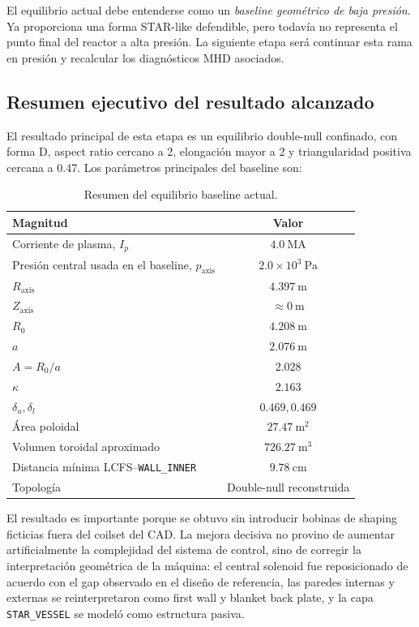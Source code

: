 \documentclass[11pt,a4paper]{article}
\begin{document}
El equilibrio actual debe entenderse como un \emph{baseline geométrico de baja presión}. Ya
proporciona una forma STAR-like defendible, pero todavía no representa el punto final del
reactor a alta presión. La siguiente etapa será continuar esta rama en presión y recalcular
los diagnósticos MHD asociados.

\subsection{Resumen ejecutivo del resultado alcanzado}
El resultado principal de esta etapa es un equilibrio double-null confinado, con forma D,
aspect ratio cercano a 2, elongación mayor a 2 y triangularidad positiva cercana a 0.47. Los
parámetros principales del baseline son:

\begin{table}[htbp]
\centering
\caption{Resumen del equilibrio baseline actual.}
\label{tab:baseline_summary_exec}
\begin{tabular}{lc}
\toprule
\textbf{Magnitud} & \textbf{Valor} \\
\midrule
Corriente de plasma, $I_p$ & $4.0~\mathrm{MA}$ \\
Presión central usada en el baseline, $p_{\mathrm{axis}}$ & $2.0\times 10^3~\mathrm{Pa}$ \\
$R_{\mathrm{axis}}$ & $4.397~\mathrm{m}$ \\
$Z_{\mathrm{axis}}$ & $\approx 0~\mathrm{m}$ \\
$R_0$ & $4.208~\mathrm{m}$ \\
$a$ & $2.076~\mathrm{m}$ \\
$A=R_0/a$ & $2.028$ \\
$\kappa$ & $2.163$ \\
$\delta_u,\delta_l$ & $0.469,0.469$ \\
Área poloidal & $27.47~\mathrm{m^2}$ \\
Volumen toroidal aproximado & $726.27~\mathrm{m^3}$ \\
Distancia mínima LCFS--\texttt{WALL\_INNER} & $9.78~\mathrm{cm}$ \\
Topología & Double-null reconstruida \\
\bottomrule
\end{tabular}
\end{table}

El resultado es importante porque se obtuvo sin introducir bobinas de shaping ficticias fuera
del coilset del CAD. La mejora decisiva no provino de aumentar artificialmente la complejidad
del sistema de control, sino de corregir la interpretación geométrica de la máquina: el central
solenoid fue reposicionado de acuerdo con el gap observado en el diseño de referencia, las
paredes internas y externas se reinterpretaron como first wall y blanket back plate, y la capa
\texttt{STAR\_VESSEL} se modeló como estructura pasiva.
\end{document}
